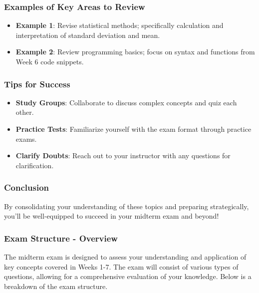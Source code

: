 \documentclass[aspectratio=169]{beamer}
\begin{document}
\begin{frame}[fragile]
    \frametitle{Examples of Key Areas to Review}
    \begin{itemize}
        \item \textbf{Example 1}: Revise statistical methods; specifically calculation and interpretation of standard deviation and mean.
        \item \textbf{Example 2}: Review programming basics; focus on syntax and functions from Week 6 code snippets.
    \end{itemize}
\end{frame}

\begin{frame}[fragile]
    \frametitle{Tips for Success}
    \begin{itemize}
        \item \textbf{Study Groups}: Collaborate to discuss complex concepts and quiz each other.
        \item \textbf{Practice Tests}: Familiarize yourself with the exam format through practice exams.
        \item \textbf{Clarify Doubts}: Reach out to your instructor with any questions for clarification.
    \end{itemize}
\end{frame}

\begin{frame}[fragile]
    \frametitle{Conclusion}
    By consolidating your understanding of these topics and preparing strategically, you'll be well-equipped to succeed in your midterm exam and beyond!
\end{frame}

\begin{frame}[fragile]
    \frametitle{Exam Structure - Overview}
    The midterm exam is designed to assess your understanding and application of key concepts covered in Weeks 1-7. The exam will consist of various types of questions, allowing for a comprehensive evaluation of your knowledge. Below is a breakdown of the exam structure.
\end{frame}
\end{document}
